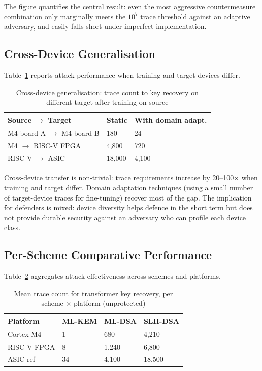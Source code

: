 \documentclass[sigconf,nonacm]{acmart}
\begin{document}
The figure quantifies the central result: even the most aggressive
countermeasure combination only marginally meets the $10^7$ trace
threshold against an adaptive adversary, and easily falls short under
imperfect implementation.

\subsection{Cross-Device Generalisation}

Table~\ref{tab:crossdev} reports attack performance when training and
target devices differ.

\begin{table}[h]
\caption{Cross-device generalisation: trace count to key recovery
on different target after training on source}
\label{tab:crossdev}
\small
\begin{tabularx}{\columnwidth}{@{}p{2.4cm}X X@{}}
\toprule
\textbf{Source $\to$ Target} & \textbf{Static} & \textbf{With domain adapt.} \\
\midrule
M4 board A $\to$ M4 board B   &    180 &    24 \\
M4 $\to$ RISC-V FPGA          &  4{,}800 &   720 \\
RISC-V $\to$ ASIC             & 18{,}000 & 4{,}100 \\
\bottomrule
\end{tabularx}
\end{table}

Cross-device transfer is non-trivial: trace requirements increase by
20--100$\times$ when training and target differ. Domain adaptation
techniques (using a small number of target-device traces for fine-tuning)
recover most of the gap. The implication for defenders is mixed:
device diversity helps defence in the short term but does not provide
durable security against an adversary who can profile each device class.

\subsection{Per-Scheme Comparative Performance}

Table~\ref{tab:perscheme} aggregates attack effectiveness across
schemes and platforms.

\begin{table}[h]
\caption{Mean trace count for transformer key recovery, per scheme
$\times$ platform (unprotected)}
\label{tab:perscheme}
\small
\begin{tabularx}{\columnwidth}{@{}p{2.0cm}X X X@{}}
\toprule
\textbf{Platform} & \textbf{ML-KEM} & \textbf{ML-DSA} & \textbf{SLH-DSA} \\
\midrule
Cortex-M4   &     1 &    680 &  4{,}210 \\
RISC-V FPGA &     8 & 1{,}240 &  6{,}800 \\
ASIC ref    &    34 & 4{,}100 & 18{,}500 \\
\bottomrule
\end{tabularx}
\end{table}
\end{document}

